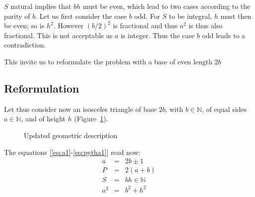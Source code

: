 \documentclass[11pt, twoside, a4paper]{article}
\newcommand{\Figure}[1]{Figure~\ref{#1}}
\newcommand{\Nat}{\mathbb{N}}
\begin{document}
    $S$ natural implies that $bh$ must be even, which lead to two cases according to the parity of $b$. Let us first consider the case $b$ odd. For $S$ to be integral, $h$ must then be even; so is $h^2$. However $(b/2)^2$ is fractional and thus $a^2$ is thus also fractional. This is not acceptable as $a$ is integer. Thus the case $b$ odd leads to a contradiction.

    This invite us to reformulate the problem with a base of even length $2b$

    \subsection{Reformulation}
    Let thus consider now an isosceles triangle of base $2b$, with $b\in\Nat$, of equal sides $a\in\Nat$, and of height $h$ (\Figure{fig:triangle2}).
    
    \begin{figure}[h!]
        \begin{center}
            \caption{Updated geometric description}
            \label{fig:triangle2}
        \end{center}
    \end{figure}
    
    The equations [\ref{eq:a1}-\ref{eq:pytha1}] read now:
    \begin{eqnarray}
    a & = & 2b \pm 1 \\
    P & = & 2(a+b) \\ 
    S & = & bh \in \Nat\\
    a^2 & = & b^2 + h^2 
    \end{eqnarray} 
\end{document}
